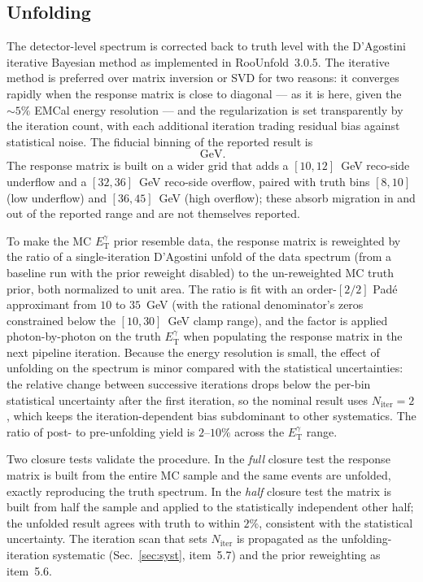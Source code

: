 \documentclass[11pt]{article}
\newcommand{\ETg}{E_{\mathrm{T}}^{\gamma}}
\begin{document}
\subsection{Unfolding}

The detector-level spectrum is corrected back to truth level with the D'Agostini
iterative Bayesian method as implemented in RooUnfold~3.0.5. The iterative method
is preferred over matrix inversion or SVD for two reasons: it converges rapidly
when the response matrix is close to diagonal --- as it is here, given the
$\sim5\%$ EMCal energy resolution --- and the regularization is set transparently
by the iteration count, with each additional iteration trading residual bias
against statistical noise. The fiducial binning of the reported result is
\begin{equation}
  [12,14,16,18,20,22,24,26,28,32]~\mathrm{GeV}.
\end{equation}
The response matrix is built on a wider grid that adds a $[10,12]$~GeV reco-side
underflow and a $[32,36]$~GeV reco-side overflow, paired with truth bins
$[8,10]$ (low underflow) and $[36,45]$~GeV (high overflow); these absorb migration
in and out of the reported range and are not themselves reported.

To make the MC $\ETg$ prior resemble data, the response matrix is reweighted by
the ratio of a single-iteration D'Agostini unfold of the data spectrum (from a
baseline run with the prior reweight disabled) to the un-reweighted MC truth
prior, both normalized to unit area. The ratio is fit with an order-$[2/2]$
Pad\'e approximant from $10$ to $35$~GeV (with the rational denominator's zeros
constrained below the $[10,30]$~GeV clamp range), and the factor is applied
photon-by-photon on the truth $\ETg$ when populating the response matrix in
the next pipeline iteration. Because the energy resolution is small, the effect of
unfolding on the spectrum is minor compared with the statistical uncertainties:
the relative change between successive iterations drops below the per-bin
statistical uncertainty after the first iteration, so the nominal result uses
$N_{\mathrm{iter}}=2$, which keeps the iteration-dependent bias subdominant to
other systematics. The ratio of post- to pre-unfolding yield is $2$--$10\%$ across
the $\ETg$ range.

Two closure tests validate the procedure. In the \emph{full} closure test the
response matrix is built from the entire MC sample and the same events are
unfolded, exactly reproducing the truth spectrum. In the \emph{half} closure test
the matrix is built from half the sample and applied to the statistically
independent other half; the unfolded result agrees with truth to within $2\%$,
consistent with the statistical uncertainty. The iteration scan that sets
$N_{\mathrm{iter}}$ is propagated as the unfolding-iteration systematic
(Sec.~\ref{sec:syst}, item~5.7) and the prior reweighting as item~5.6.
\end{document}
